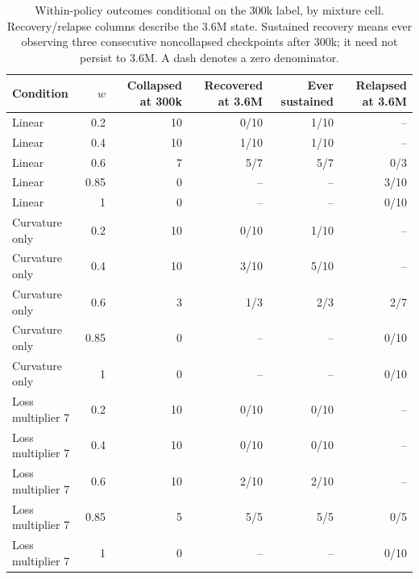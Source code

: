 \begin{table}[t]
\centering\small
\caption{Within-policy outcomes conditional on the 300k label, by mixture cell. Recovery/relapse columns describe the 3.6M state. Sustained recovery means ever observing three consecutive noncollapsed checkpoints after 300k; it need not persist to 3.6M. A dash denotes a zero denominator.}
\label{tab:confirmed_recovery}
\begin{tabular}{@{}lrrrrr@{}}\toprule
Condition & $w$ & Collapsed at 300k & Recovered at 3.6M & Ever sustained & Relapsed at 3.6M \\
\midrule
Linear & 0.2 & 10 & 0/10 & 1/10 & -- \\
Linear & 0.4 & 10 & 1/10 & 1/10 & -- \\
Linear & 0.6 & 7 & 5/7 & 5/7 & 0/3 \\
Linear & 0.85 & 0 & -- & -- & 3/10 \\
Linear & 1 & 0 & -- & -- & 0/10 \\
Curvature only & 0.2 & 10 & 0/10 & 1/10 & -- \\
Curvature only & 0.4 & 10 & 3/10 & 5/10 & -- \\
Curvature only & 0.6 & 3 & 1/3 & 2/3 & 2/7 \\
Curvature only & 0.85 & 0 & -- & -- & 0/10 \\
Curvature only & 1 & 0 & -- & -- & 0/10 \\
Loss multiplier 7 & 0.2 & 10 & 0/10 & 0/10 & -- \\
Loss multiplier 7 & 0.4 & 10 & 0/10 & 0/10 & -- \\
Loss multiplier 7 & 0.6 & 10 & 2/10 & 2/10 & -- \\
Loss multiplier 7 & 0.85 & 5 & 5/5 & 5/5 & 0/5 \\
Loss multiplier 7 & 1 & 0 & -- & -- & 0/10 \\
\bottomrule\end{tabular}
\end{table}

